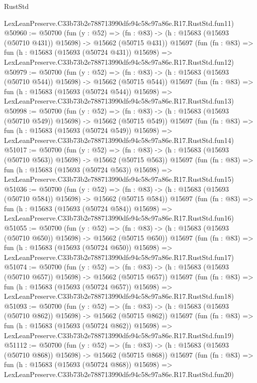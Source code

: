 \begin{lexlean}{RustStd}
\begin{coremodule}
    LexLeanPreserve.C33b73b2e788713990dfe94c58c97a86e.R17.RustStd.fun11)
@50960 := @50700
    (fun (y : @52) =>
    (fn : @83) -> (h : @15683 (@15693 (@50710 @431)) @15698) -> @15662 (@50715 @431))
    @15697
    (fun (fn : @83) =>
    fun (h : @15683 (@15693 (@50724 @431)) @15698) =>
    LexLeanPreserve.C33b73b2e788713990dfe94c58c97a86e.R17.RustStd.fun12)
@50979 := @50700
    (fun (y : @52) =>
    (fn : @83) -> (h : @15683 (@15693 (@50710 @544)) @15698) -> @15662 (@50715 @544))
    @15697
    (fun (fn : @83) =>
    fun (h : @15683 (@15693 (@50724 @544)) @15698) =>
    LexLeanPreserve.C33b73b2e788713990dfe94c58c97a86e.R17.RustStd.fun13)
@50998 := @50700
    (fun (y : @52) =>
    (fn : @83) -> (h : @15683 (@15693 (@50710 @549)) @15698) -> @15662 (@50715 @549))
    @15697
    (fun (fn : @83) =>
    fun (h : @15683 (@15693 (@50724 @549)) @15698) =>
    LexLeanPreserve.C33b73b2e788713990dfe94c58c97a86e.R17.RustStd.fun14)
@51017 := @50700
    (fun (y : @52) =>
    (fn : @83) -> (h : @15683 (@15693 (@50710 @563)) @15698) -> @15662 (@50715 @563))
    @15697
    (fun (fn : @83) =>
    fun (h : @15683 (@15693 (@50724 @563)) @15698) =>
    LexLeanPreserve.C33b73b2e788713990dfe94c58c97a86e.R17.RustStd.fun15)
@51036 := @50700
    (fun (y : @52) =>
    (fn : @83) -> (h : @15683 (@15693 (@50710 @584)) @15698) -> @15662 (@50715 @584))
    @15697
    (fun (fn : @83) =>
    fun (h : @15683 (@15693 (@50724 @584)) @15698) =>
    LexLeanPreserve.C33b73b2e788713990dfe94c58c97a86e.R17.RustStd.fun16)
@51055 := @50700
    (fun (y : @52) =>
    (fn : @83) -> (h : @15683 (@15693 (@50710 @650)) @15698) -> @15662 (@50715 @650))
    @15697
    (fun (fn : @83) =>
    fun (h : @15683 (@15693 (@50724 @650)) @15698) =>
    LexLeanPreserve.C33b73b2e788713990dfe94c58c97a86e.R17.RustStd.fun17)
@51074 := @50700
    (fun (y : @52) =>
    (fn : @83) -> (h : @15683 (@15693 (@50710 @657)) @15698) -> @15662 (@50715 @657))
    @15697
    (fun (fn : @83) =>
    fun (h : @15683 (@15693 (@50724 @657)) @15698) =>
    LexLeanPreserve.C33b73b2e788713990dfe94c58c97a86e.R17.RustStd.fun18)
@51093 := @50700
    (fun (y : @52) =>
    (fn : @83) -> (h : @15683 (@15693 (@50710 @862)) @15698) -> @15662 (@50715 @862))
    @15697
    (fun (fn : @83) =>
    fun (h : @15683 (@15693 (@50724 @862)) @15698) =>
    LexLeanPreserve.C33b73b2e788713990dfe94c58c97a86e.R17.RustStd.fun19)
@51112 := @50700
    (fun (y : @52) =>
    (fn : @83) -> (h : @15683 (@15693 (@50710 @868)) @15698) -> @15662 (@50715 @868))
    @15697
    (fun (fn : @83) =>
    fun (h : @15683 (@15693 (@50724 @868)) @15698) =>
    LexLeanPreserve.C33b73b2e788713990dfe94c58c97a86e.R17.RustStd.fun20)

\end{coremodule}
\end{lexlean}

